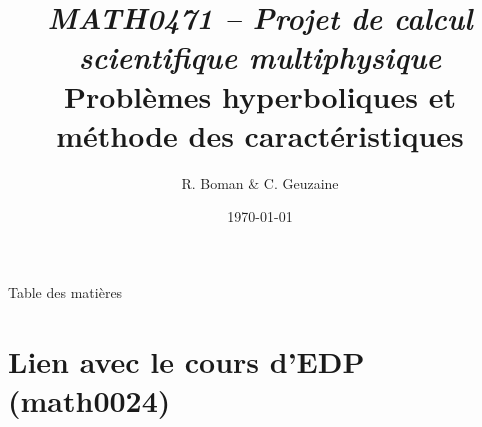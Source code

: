 \documentclass[
mode=present,    %
paper=a4paper,   %
orient=landscape,
display=slides,   %
size=10pt,
style=romain   %
]{powerdot}
\begin{document}
    \setlength{\belowdisplayskip}{2pt}
    \setlength{\belowdisplayshortskip}{2pt}
    \setlength{\abovedisplayskip}{2pt}
    \setlength{\abovedisplayshortskip}{2pt}

\title{\vspace{-5mm}
         {\sl\small MATH0471 -- Projet de calcul scientifique multiphysique} \\
        \vspace{5mm}
        \Large Problèmes hyperboliques et méthode des caractéristiques\\
        \vspace{5mm}
}
\author{R. Boman \& C. Geuzaine}
\date{\today}
\maketitle


\begin{slide}[toc=,bm=]{Table des matières}
\tableofcontents[content=sections] %
\end{slide}


\section[toc=Lien math0024]{Lien avec le cours d'EDP (math0024)}
\end{document}

